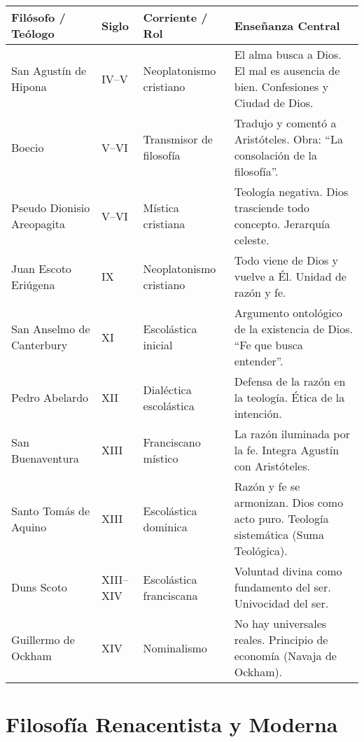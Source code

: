 \documentclass[12pt]{article}
\begin{document}
\begin{tabularx}{\textwidth}{@{} l l l X @{}}
\toprule
\textbf{Filósofo / Teólogo} & \textbf{Siglo} & \textbf{Corriente / Rol} & \textbf{Enseñanza Central} \\
\midrule
San Agustín de Hipona     & IV–V         & Neoplatonismo cristiano & El alma busca a Dios. El mal es ausencia de bien. Confesiones y Ciudad de Dios. \\
Boecio                    & V–VI         & Transmisor de filosofía & Tradujo y comentó a Aristóteles. Obra: “La consolación de la filosofía”. \\
Pseudo Dionisio Areopagita & V–VI        & Mística cristiana       & Teología negativa. Dios trasciende todo concepto. Jerarquía celeste. \\
Juan Escoto Eriúgena      & IX           & Neoplatonismo cristiano & Todo viene de Dios y vuelve a Él. Unidad de razón y fe. \\
San Anselmo de Canterbury & XI           & Escolástica inicial     & Argumento ontológico de la existencia de Dios. “Fe que busca entender”. \\
Pedro Abelardo            & XII          & Dialéctica escolástica  & Defensa de la razón en la teología. Ética de la intención. \\
San Buenaventura          & XIII         & Franciscano místico     & La razón iluminada por la fe. Integra Agustín con Aristóteles. \\
Santo Tomás de Aquino     & XIII         & Escolástica dominica    & Razón y fe se armonizan. Dios como acto puro. Teología sistemática (Suma Teológica). \\
Duns Scoto               & XIII–XIV     & Escolástica franciscana & Voluntad divina como fundamento del ser. Univocidad del ser. \\
Guillermo de Ockham      & XIV          & Nominalismo             & No hay universales reales. Principio de economía (Navaja de Ockham). \\
\bottomrule
\end{tabularx}

\section*{Filosofía Renacentista y Moderna}
\end{document}
